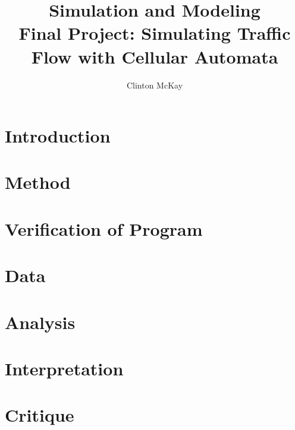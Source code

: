 \documentclass{article}%
\begin{document}
    \title{Simulation and Modeling\\Final Project: Simulating Traffic Flow with Cellular Automata}
    \author{Clinton McKay}
    \maketitle

    \twocolumn

    \section{Introduction}

    \section{Method}

    \section{Verification of Program}
    
    \section{Data}
    \section{Analysis}

    \section{Interpretation}

    \section{Critique} 

\end{document}

